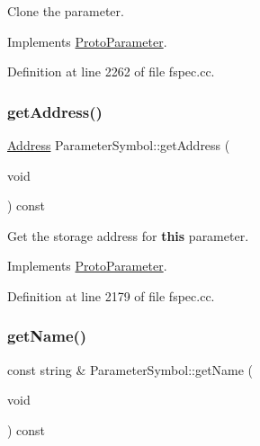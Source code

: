 Clone the parameter. 



Implements \mbox{\hyperlink{class_proto_parameter_a3f09d39a3c5f10b368753eaa0391bea8}{Proto\+Parameter}}.



Definition at line 2262 of file fspec.\+cc.

\mbox{\label{class_parameter_symbol_a758e26ad63c7c212d9a70c5a82bbebf4}} 
\subsubsection{\texorpdfstring{getAddress()}{getAddress()}}
{\footnotesize\ttfamily \mbox{\hyperlink{class_address}{Address}} Parameter\+Symbol\+::get\+Address (\begin{DoxyParamCaption}\item[{void}]{ }\end{DoxyParamCaption}) const\hspace{0.3cm}{\ttfamily [virtual]}}



Get the storage address for {\bfseries{this}} parameter. 



Implements \mbox{\hyperlink{class_proto_parameter_a33c604ed7e06ae0ca6ac491b46739343}{Proto\+Parameter}}.



Definition at line 2179 of file fspec.\+cc.

\mbox{\label{class_parameter_symbol_ad0e7cd03c77c5c514b980a0410547c7c}} 
\subsubsection{\texorpdfstring{getName()}{getName()}}
{\footnotesize\ttfamily const string \& Parameter\+Symbol\+::get\+Name (\begin{DoxyParamCaption}\item[{void}]{ }\end{DoxyParamCaption}) const\hspace{0.3cm}{\ttfamily [virtual]}}



